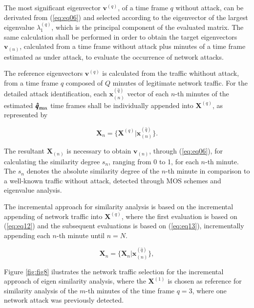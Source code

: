 \documentclass[review]{elsarticle}
\begin{document}
The most significant eigenvector $\boldsymbol{v}^{(q)}$, of a time frame $q$ without attack, can be derivated from (\ref{eq:eq06}) and selected according to the eigenvector of the largest eigenvalue $\lambda_1^{(q)}$, which is the principal component of the evaluated matrix. The same calculation shall be performed in order to obtain the target eigenvectors $\boldsymbol{v}_{(n)}$, calculated from a time frame without attack plus minutes of a time frame estimated as under attack, to evaluate the occurrence of network attacks. 

The reference eigenvectors $\boldsymbol{v}^{(q)}$ is calculated from the traffic whithout attack, from a time frame $q$ composed of $Q$ minutes of legitimate network traffic. For the detailed attack identification, each $\boldsymbol{x}^{(\hat{q})}_{(n)}$ vector of each $n$-th minutes of the estimated $\rm{\boldsymbol{\hat{q}}}_{\rm max}$ time frames shall be individually appended into $\boldsymbol{X}^{(q)}$, as represented by

\begin{equation}\label{eq:eq12}
\boldsymbol{X}_{n} = \{\boldsymbol{X}^{(q)} | \boldsymbol{x}^{(\hat{q})}_{(n)}\}.
\end{equation}

The resultant $\boldsymbol{X}_{(n)}$ is necessary to obtain $\boldsymbol{v}_{(n)}$, through (\ref{eq:eq06}), for calculating the similarity degree $s_n$, ranging from 0 to 1, for each $n$-th minute. The $s_n$ denotes the absolute similarity degree of the $n$-th minute in comparison to a well-known traffic without attack, detected through MOS schemes and eigenvalue analysis.

The incremental approach for similarity analysis is based on the incremental appending of network traffic into $\boldsymbol{X}^{(q)}$, where the first evaluation is based on (\ref{eq:eq12}) and the subsequent evaluations is based on (\ref{eq:eq13}), incrementally appending each $n$-th minute until $n=N$.

\begin{equation}\label{eq:eq13}
\boldsymbol{X}_{n} = \{\boldsymbol{X}_{n} | \boldsymbol{x}^{(\hat{q})}_{(n)}\},
\end{equation}

Figure \ref{fig:fig8} ilustrates the network traffic selection for the incremental approach of eigen similarity analysis, where the $\boldsymbol{X}^{(1)}$ is chosen as reference for similarity analysis of the $m$-th minutes of the time frame $q=3$, where one network attack was previously detected. 
\end{document}

